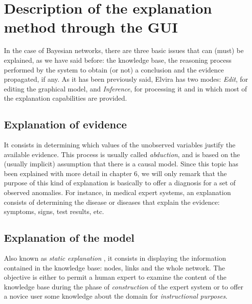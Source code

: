 \section{Description of the explanation method through the GUI}
\label{sec:description} In the case of Bayesian networks, there
are three basic issues that can (must) be explained, as we have
said before: the knowledge base, the reasoning process performed
by the system to obtain (or not) a conclusion and the evidence
propagated, if any. As it has been previously said, Elvira has two
modes: \emph{Edit}, for editing the graphical model, and
\emph{Inference}, for processing it and in which most of the
explanation capabilities are provided.

\subsection{Explanation of evidence}

It consists in determining which values of the unobserved
variables justify the available evidence. This process is usually
called \emph{abduction}, and is based on the (usually implicit)
assumption that there is a causal model. Since this topic has been
explained with more detail in chapter 6, we will only remark that
the purpose of this kind of explanation is basically to offer a
diagnosis for a set of observed anomalies. For instance, in
medical expert systems, an explanation consists of determining the
disease or diseases that explain the evidence: symptoms, signs,
test results, etc.


\subsection{Explanation of the model} \label{sec:static}Also known as \textit{static explanation}
\cite{Henrion90}, it consists in displaying the information
contained in the knowledge base: nodes, links and the whole
network. The objective is either to permit a human expert to
examine the content of the knowledge base during the phase of
\emph{construction} of the expert system or to offer a novice user
some knowledge about the domain for \emph{instructional purposes}.

